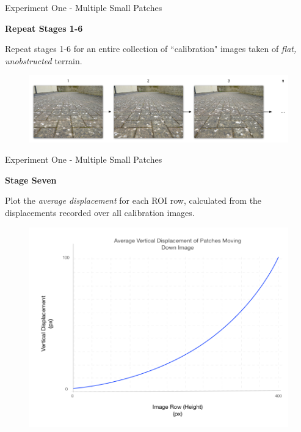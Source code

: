 \documentclass[10pt, compress]{beamer}
\begin{document}
\begin{frame}{Experiment One - Multiple Small Patches}

\textbf{Repeat Stages 1-6} \\ \vspace{0.2cm}

Repeat stages 1-6 for an entire collection of ``calibration" images taken of \emph{flat, unobstructed} terrain.

\begin{figure}[ht!]
\centering
\includegraphics[scale=0.3]{calibimages.png}
\end{figure}

\end{frame}

\begin{frame}{Experiment One - Multiple Small Patches}

\textbf{Stage Seven} \\ \vspace{0.2cm}

Plot the \emph{average displacement} for each ROI row, calculated from the displacements recorded over all calibration images.

\begin{figure}[ht!]
\centering
\includegraphics[scale=0.45]{graph.png}
\end{figure}

\end{frame}
\end{document}
